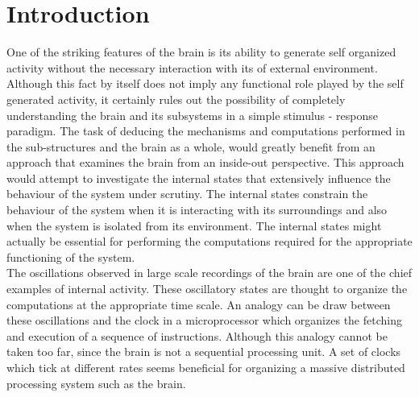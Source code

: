 
\chapter{Introduction} 

\label{intro}

One of the striking features of the brain is its ability to generate self organized activity without the necessary interaction with its of external environment. Although this fact by itself does not imply any functional role played by the self generated activity, it certainly rules out the possibility of completely understanding the brain and its subsystems in a simple stimulus - response paradigm. The task of deducing the mechanisms and computations performed in the sub-structures and  the brain as a whole, would greatly benefit from an approach that examines the brain from an inside-out perspective. This approach would attempt to investigate the internal states that extensively influence the behaviour of the system under scrutiny. The internal states constrain the behaviour of the system when it is interacting with its surroundings and also when the system is isolated from its environment. The internal states might actually be essential for performing the computations required for the appropriate functioning of the system. \\

The oscillations observed in large scale recordings of the brain are one of the chief examples of internal  activity. These oscillatory states are thought to organize the computations at the appropriate time scale. An analogy can be draw between these oscillations and the clock in a microprocessor which organizes the fetching and execution of a sequence of instructions. Although this analogy cannot be taken too far, since the brain is not a sequential processing unit. A set of clocks which tick at different rates seems beneficial for organizing a massive distributed processing system such as the brain. \\

